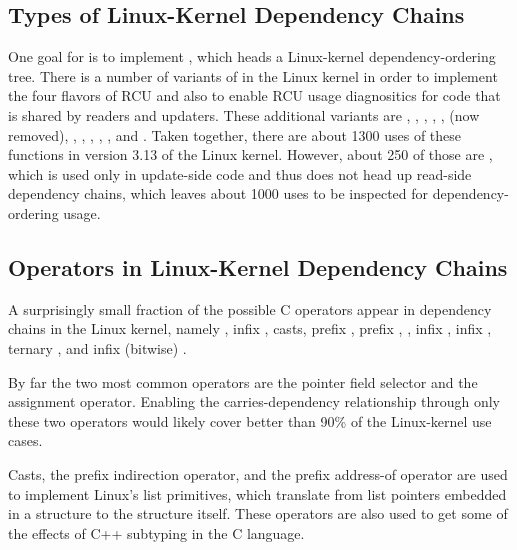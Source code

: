 \documentclass[letterpaper,twocolumn,10pt]{article}
\begin{document}
\subsection{Types of Linux-Kernel Dependency Chains}
\label{sec:Types of Linux-Kernel Dependency Chains}

One goal for  is to implement
, which heads a Linux-kernel dependency-ordering tree.
There is a number of variants of  in the
Linux kernel in order to implement the four flavors of RCU and also to enable
RCU usage diagnositics for code that is shared by readers and updaters.
These additional variants are
,
,
,
,
,
 (now removed),
,
,
, 
,
, and
.
Taken together, there are about 1300 uses of these functions in version 3.13
of the Linux kernel.
However, about 250 of those are , which
is used only in update-side code and thus does not head up read-side
dependency chains, which leaves about 1000 uses to be inspected for
dependency-ordering usage.

\subsection{Operators in Linux-Kernel Dependency Chains}
\label{sec:Operators in Linux-Kernel Dependency Chains}

A surprisingly small fraction of the possible C operators appear in
dependency chains in the Linux kernel, namely
\co{->}, infix \co{=}, casts, prefix \co{&}, prefix \co{*}, \co{[]},
infix \co{+}, infix \co{-}, ternary , and infix (bitwise) \co{&}.

By far the two most common operators are the \co{->} pointer field selector
and the \co{=} assignment operator.
Enabling the carries-dependency relationship through only these two
operators would likely cover better than 90\% of the Linux-kernel use cases.

Casts, the prefix \co{*} indirection operator, and the prefix
\co{&} address-of operator are used to implement Linux's list
primitives, which translate from list pointers embedded in a
structure to the structure itself.
These operators are also used to get some of the effects of C++
subtyping in the C language.
\end{document}
